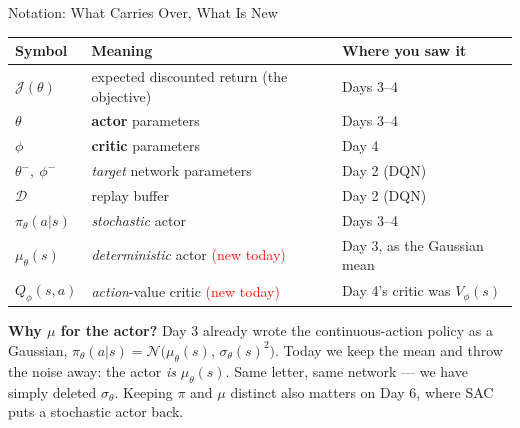 \begin{frame}{Notation: What Carries Over, What Is New}
\vspace{-0.2em}
\begin{center}
\small
\renewcommand{\arraystretch}{1.25}
\begin{tabular}{lll}
\hline
\textbf{Symbol} & \textbf{Meaning} & \textbf{Where you saw it} \\
\hline
$\mathcal{J}(\theta)$        & expected discounted return (the objective)   & Days 3--4 \\
$\theta$                     & \textbf{actor} parameters                    & Days 3--4 \\
$\phi$                       & \textbf{critic} parameters                   & Day 4 \\
$\theta^{-},\ \phi^{-}$      & \emph{target} network parameters             & Day 2 (DQN) \\
$\mathcal{D}$                & replay buffer                                & Day 2 (DQN) \\
$\pi_\theta(a|s)$            & \emph{stochastic} actor                      & Days 3--4 \\
$\mu_\theta(s)$              & \emph{deterministic} actor \; \textcolor{red}{(new today)} & Day 3, as the Gaussian mean \\
$Q_\phi(s,a)$                & \emph{action}-value critic \; \textcolor{red}{(new today)} & Day 4's critic was $V_\phi(s)$ \\
\hline
\end{tabular}
\end{center}
\vspace{0.5em}
{\footnotesize
\textbf{Why $\mu$ for the actor?} Day 3 already wrote the continuous-action policy as a Gaussian,
$\pi_\theta(a|s) = \mathcal{N}\!\big(\mu_\theta(s),\, \sigma_\theta(s)^2\big)$.
Today we keep the mean and throw the noise away: the actor \emph{is} $\mu_\theta(s)$. Same letter, same network --- we have simply deleted $\sigma_\theta$. Keeping $\pi$ and $\mu$ distinct also matters on Day 6, where SAC puts a stochastic actor back.}
\end{frame}
